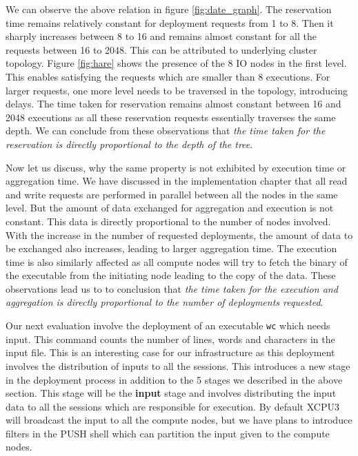 We can observe the above relation in figure \ref{fig:date_graph}. The 
reservation time remains relatively constant for deployment requests from 1 to
8.  Then it sharply increases between 8 to 16 and remains almost constant for
all the requests between 16 to 2048.  This can be attributed to underlying
cluster topology. Figure \ref{fig:hare} shows the presence of the 8 IO nodes
in the first level. This enables satisfying the requests which are smaller
than 8 executions. For larger requests, one more level needs to be traversed
in the topology, introducing delays.  The time taken for reservation remains
almost constant between 16 and 2048 executions as all these reservation
requests essentially traverses the same depth.  We can conclude from these
observations that \textit{the time taken for the reservation is directly
proportional to the depth of the tree}.

Now let us discuss, why the same property is not exhibited by execution time or
aggregation time. We have discussed in the implementation chapter that all
read and write requests are performed in parallel between all the nodes in the
same level.  But the amount of data exchanged for aggregation and execution is
not constant.  This data is directly proportional to the number of nodes
involved.  With the increase in the number of requested deployments, the
amount of data to be exchanged also increases, leading to larger aggregation
time. The execution time is also similarly affected as all compute nodes will
try to fetch the binary of the executable from the initiating node leading to
the copy of the data. These observations lead us to to conclusion that
\textit{the time taken for the execution and aggregation is directly
proportional to the number of deployments requested}.

Our next evaluation involve the deployment of an executable \texttt{wc} which
needs input. This command counts the number of lines, words and characters in
the input file.  This is an interesting case for our infrastructure as this
deployment involves the distribution of inputs to all the sessions.  This
introduces a new stage in the deployment process in addition to the 5 stages we
described in the above section.  This stage will be the \textbf{input} stage and
involves distributing the input data to all the sessions which are responsible
for execution.  By default XCPU3 will broadcast the input to all the compute
nodes, but we have plans to introduce filters in the PUSH shell which can
partition the input given to the compute  nodes. 

